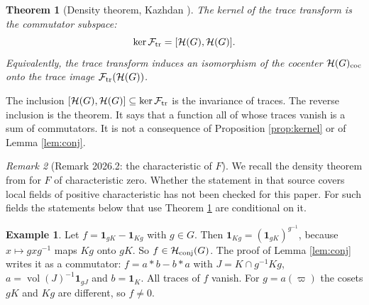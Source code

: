\documentclass[12pt,letterpaper]{amsart}
\numberwithin{equation}{section}
\newtheorem{theorem}{Theorem}[section]
\theoremstyle{definition}
\newtheorem*{example*}{Example}
\theoremstyle{remark}
\newtheorem{remark}[theorem]{Remark}
\newcommand{\calH}{\mathcal H}
\newcommand{\vol}{\operatorname{vol}}
\begin{document}
\begin{theorem}[Density theorem, Kazhdan \cite{Ka86}]\label{thm:density}
The kernel of the trace transform is the commutator subspace:
\[
\ker\mathcal F_{\rm tr}=[\calH(G),\calH(G)] .
\]
Equivalently, the trace transform induces an isomorphism of the cocenter $\calH(G)_{\rm coc}$ onto the trace image $\mathcal F_{\rm tr}(\calH(G))$.
\end{theorem}
The inclusion $[\calH(G),\calH(G)]\subseteq\ker\mathcal F_{\rm tr}$ is the invariance of traces. The reverse inclusion is the theorem. It says that a function all of whose traces vanish is a sum of commutators. It is not a consequence of Proposition \ref{prop:kernel} or of Lemma \ref{lem:conj}.
\begin{remark}[Remark 2026.2: the characteristic of $F$]\label{rem:density-char}
We recall the density theorem from \cite{Ka86} for $F$ of characteristic zero. Whether the statement in that source covers local fields of positive characteristic has not been checked for this paper. For such fields the statements below that use Theorem \ref{thm:density} are conditional on it.
\end{remark}
\begin{example*}
Let $f=\mathbf 1_{gK}-\mathbf 1_{Kg}$ with $g\in G$. Then $\mathbf 1_{Kg}=(\mathbf 1_{gK})^{g^{-1}}$, because $x\mapsto gxg^{-1}$ maps $Kg$ onto $gK$. So $f\in\calH_{\rm conj}(G)$. The proof of Lemma \ref{lem:conj} writes it as a commutator: $f=a*b-b*a$ with $J=K\cap g^{-1}Kg$, $a=\vol(J)^{-1}\mathbf 1_{gJ}$ and $b=\mathbf 1_K$. All traces of $f$ vanish. For $g=a(\varpi)$ the cosets $gK$ and $Kg$ are different, so $f\ne0$.
\end{example*}
\end{document}
